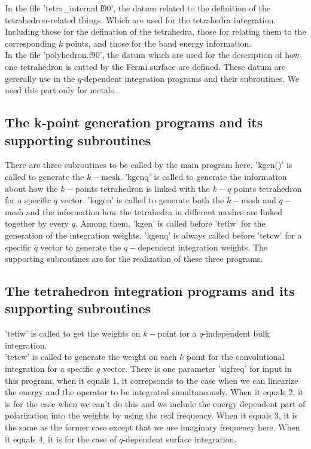 \documentclass[10pt]{article}
\begin{document}
In the file 'tetra\_internal.f90', the datum related to the definition of the tetrahedron-related things. Which are used for the tetrahedra integration. Including those for the defination of the tetrahedra, those for relating them to the corresponding $k$ points, and those for the band energy information.\\


In the file 'polyhedron.f90', the datum which are used for the description of how one tetrahedron is cutted by the Fermi surface are defined. These datum are gererally use in the $q$-dependent integration programs and their subroutines. We need this part only for metals. \\


\subsection{The k-point generation programs and its supporting subroutines}


There are three subroutines to be called by the main program here. 'kgen()' is called to generate the $k-$mesh. 
'kgenq' is called to generate the information about how the $k-$points tetrahedron is linked with the $k-q$ points tetrahedron for a specific $q$ vector. 'kqgen' is called to generate both the $k-$mesh and $q-$mesh and the information how the tetrahedra in different meshes are linked together by every $q$. Among them, 'kgen' is called before 'tetiw' for the generation of the integration weights. 'kgenq' is always called before 'tetcw' for a specific $q$ vector to generate the $q-$dependent integration weights. The supporting subroutines are for the realization of these three programs.\\


\subsection{The tetrahedron integration programs and its supporting subroutines}


'tetiw' is called to get the weights on $k-$point for a $q$-independent bulk integration. \\


'tetcw' is called to generate the weight on each $k$ point for the convolutional integration for a specific $q$ vector. There is one parameter 'sigfreq' for input in this program, when it equals $1$, it correpsonds to the case when we can linearize the energy and the operator to be integrated simultaneously. When it equals $2$, it is for the case when we can't do this and we include the energy dependent part of polarization into the weights by using the real frequency. When it equals $3$, it is the same as the former case except that we use imaginary frequency here. When it equals $4$, it is for the case of $q$-dependent surface integration.  \\
\end{document}
